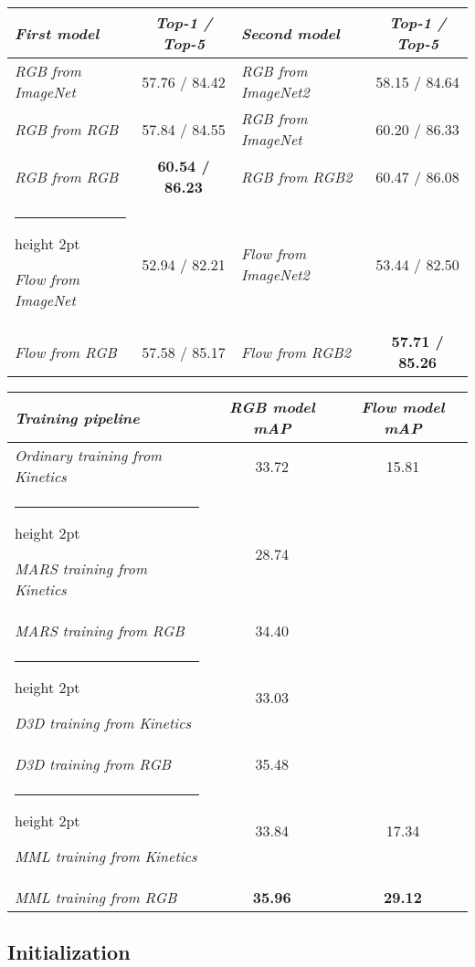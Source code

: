 \documentclass[conference]{IEEEtran}
\makeatletter
\newcommand{\thickhline}{\noalign {\ifnum 0=`}\fi \hrule height 2pt
	\futurelet \reserved@a \@xhline
}
\makeatother
\begin{document}
\begin{table*}[!t]
	\begin{minipage}{0.48\textwidth}
		\centering
		\caption{Same modality ML}
		\label{tab:sameml}
		\centering
		\begin{tabular}{|m{}|c|m{}|c|} 
			\hline \it First model & \it Top-1 / Top-5 & \it Second model & \it Top-1 / Top-5 \\ \hline
			\it RGB from ImageNet & 57.76 / 84.42 & \it RGB from ImageNet2 & 58.15 / 84.64 \\ \hline
			\it RGB from RGB & 57.84 / 84.55 & \it RGB from ImageNet & 60.20 / 86.33 \\ \hline
			\it RGB from RGB & \bf 60.54 / 86.23 & \it RGB from RGB2 & 60.47 / 86.08 \\ \thickhline
			\it Flow from ImageNet & 52.94 / 82.21 & \it Flow from ImageNet2 & 53.44 / 82.50 \\ \hline
			\it Flow from RGB & 57.58 / 85.17 & \it Flow from RGB2 & \bf 57.71 / 85.26 \\ \hline
		\end{tabular}
	\end{minipage}\hfill
	\begin{minipage}{0.48\textwidth}
		\centering
		\caption{I3D on Charades}
		\label{tab:i3d}
		\centering
		\begin{tabular}{|m{}|c|c|} 
			\hline \it Training pipeline & \it RGB model mAP & \it Flow model mAP \\ \hline
			\it Ordinary training from Kinetics & 33.72 & 15.81 \\ \thickhline
			\it MARS training from Kinetics & 28.74 &  \\ \hline
			\it MARS training from RGB & 34.40 &  \\ \thickhline
			\it D3D training from Kinetics & 33.03 &  \\ \hline
			\it D3D training from RGB & 35.48 &  \\ \thickhline
			\it MML training from Kinetics & 33.84 & 17.34 \\ \hline
			\it MML training from RGB & \bf 35.96 & \bf 29.12 \\ \hline
		\end{tabular}
	\end{minipage}
\end{table*}

\subsection{Initialization}
\end{document}

